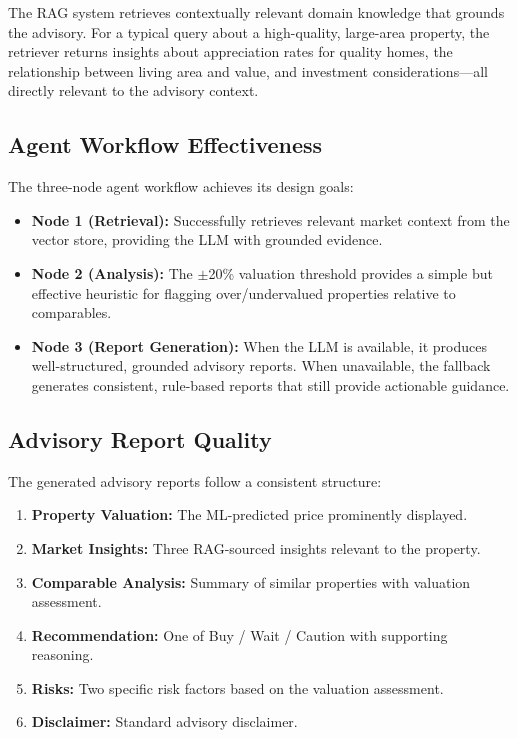 \documentclass[11pt,a4paper]{article}
\begin{document}
The RAG system retrieves contextually relevant domain knowledge that grounds the advisory.
For a typical query about a high-quality, large-area property, the retriever returns insights about appreciation rates for quality homes, the relationship between living area and value, and investment considerations---all directly relevant to the advisory context.

\subsection{Agent Workflow Effectiveness}

The three-node agent workflow achieves its design goals:

\begin{itemize}[leftmargin=*]
    \item \textbf{Node 1 (Retrieval):} Successfully retrieves relevant market context from the vector store, providing the LLM with grounded evidence.
    \item \textbf{Node 2 (Analysis):} The $\pm$20\% valuation threshold provides a simple but effective heuristic for flagging over/undervalued properties relative to comparables.
    \item \textbf{Node 3 (Report Generation):} When the LLM is available, it produces well-structured, grounded advisory reports. When unavailable, the fallback generates consistent, rule-based reports that still provide actionable guidance.
\end{itemize}

\subsection{Advisory Report Quality}

The generated advisory reports follow a consistent structure:

\begin{enumerate}[leftmargin=*]
    \item \textbf{Property Valuation:} The ML-predicted price prominently displayed.
    \item \textbf{Market Insights:} Three RAG-sourced insights relevant to the property.
    \item \textbf{Comparable Analysis:} Summary of similar properties with valuation assessment.
    \item \textbf{Recommendation:} One of Buy / Wait / Caution with supporting reasoning.
    \item \textbf{Risks:} Two specific risk factors based on the valuation assessment.
    \item \textbf{Disclaimer:} Standard advisory disclaimer.
\end{enumerate}
\end{document}
